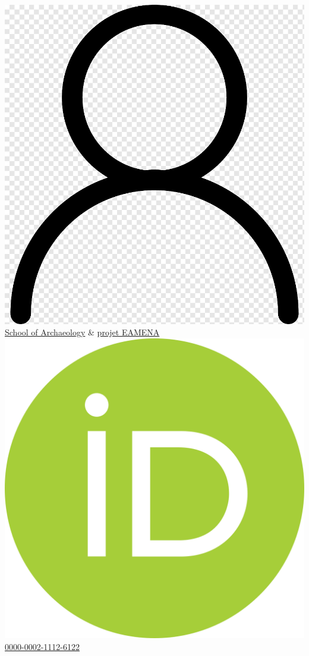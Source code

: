 \documentclass{article}
\begin{document}
\includegraphics[scale=0.01]{webpro} \quad \href{https://archit.web.ox.ac.uk/people/dr-thomas-huet}{School of Archaeology} \& \href{https://eamena.org/people/dr-thomas-huet}{projet EAMENA}\\
\includegraphics[scale=0.007]{orcid} \quad \href{https://orcid.org/0000-0002-1112-6122}{0000-0002-1112-6122} \\
\end{document}
